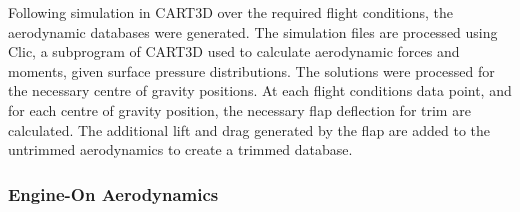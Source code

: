 		
		Following simulation in CART3D over the required flight conditions, the aerodynamic databases were generated. The simulation files are processed using Clic, a subprogram of CART3D used to calculate aerodynamic forces and moments, given surface pressure distributions. The solutions were processed for the necessary centre of gravity positions. At each flight conditions data point, and for each centre of gravity position, the necessary flap deflection for trim are calculated. The additional lift and drag generated by the flap are added to the untrimmed aerodynamics to create a trimmed database. 
		
		
		
		

		
		\subsubsection{Engine-On Aerodynamics}\label{sec:engine-on}
		
